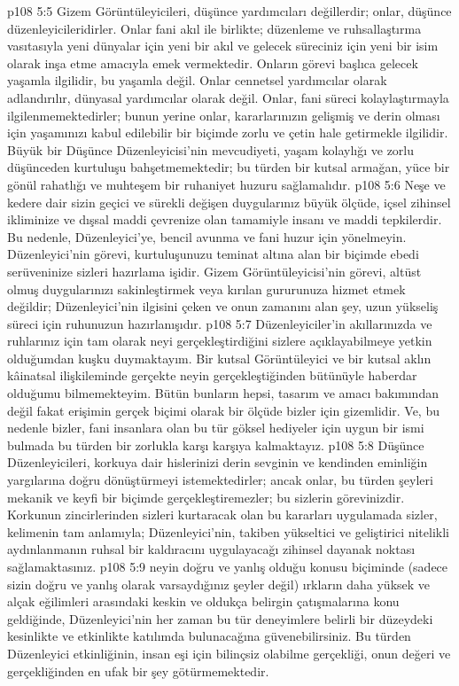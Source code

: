 \vs p108 5:5 Gizem Görüntüleyicileri, düşünce yardımcıları değillerdir; onlar, düşünce düzenleyicileridirler. Onlar fani akıl ile birlikte; düzenleme ve ruhsallaştırma vasıtasıyla yeni dünyalar için yeni bir akıl ve gelecek süreciniz için yeni bir isim olarak inşa etme amacıyla emek vermektedir. Onların görevi başlıca gelecek yaşamla ilgilidir, bu yaşamla değil. Onlar cennetsel yardımcılar olarak adlandırılır, dünyasal yardımcılar olarak değil. Onlar, fani süreci kolaylaştırmayla ilgilenmemektedirler; bunun yerine onlar, kararlarınızın gelişmiş ve derin olması için yaşamınızı kabul edilebilir bir biçimde zorlu ve çetin hale getirmekle ilgilidir. Büyük bir Düşünce Düzenleyicisi’nin mevcudiyeti, yaşam kolaylığı ve zorlu düşünceden kurtuluşu bahşetmemektedir; bu türden bir kutsal armağan, yüce bir gönül rahatlığı ve muhteşem bir ruhaniyet huzuru sağlamalıdır.
\vs p108 5:6 Neşe ve kedere dair sizin geçici ve sürekli değişen duygularınız büyük ölçüde, içsel zihinsel ikliminize ve dışsal maddi çevrenize olan tamamiyle insanı ve maddi tepkilerdir. Bu nedenle, Düzenleyici’ye, bencil avunma ve fani huzur için yönelmeyin. Düzenleyici’nin görevi, kurtuluşunuzu teminat altına alan bir biçimde ebedi serüveninize sizleri hazırlama işidir. Gizem Görüntüleyicisi’nin görevi, altüst olmuş duygularınızı sakinleştirmek veya kırılan gururunuza hizmet etmek değildir; Düzenleyici’nin ilgisini çeken ve onun zamanını alan şey, uzun yükseliş süreci için ruhunuzun hazırlanışıdır.
\vs p108 5:7 Düzenleyiciler’in akıllarınızda ve ruhlarınız için tam olarak neyi gerçekleştirdiğini sizlere açıklayabilmeye yetkin olduğumdan kuşku duymaktayım. Bir kutsal Görüntüleyici ve bir kutsal aklın kâinatsal ilişkileminde gerçekte neyin gerçekleştiğinden bütünüyle haberdar olduğumu bilmemekteyim. Bütün bunların hepsi, tasarım ve amacı bakımından değil fakat erişimin gerçek biçimi olarak bir ölçüde bizler için gizemlidir. Ve, bu nedenle bizler, fani insanlara olan bu tür göksel hediyeler için uygun bir ismi bulmada bu türden bir zorlukla karşı karşıya kalmaktayız.
\vs p108 5:8 Düşünce Düzenleyicileri, korkuya dair hislerinizi derin sevginin ve kendinden eminliğin yargılarına doğru dönüştürmeyi istemektedirler; ancak onlar, bu türden şeyleri mekanik ve keyfi bir biçimde gerçekleştiremezler; bu sizlerin görevinizdir. Korkunun zincirlerinden sizleri kurtaracak olan bu kararları uygulamada sizler, kelimenin tam anlamıyla; Düzenleyici’nin, takiben yükseltici ve geliştirici nitelikli aydınlanmanın ruhsal bir kaldıracını uygulayacağı zihinsel dayanak noktası sağlamaktasınız.
\vs p108 5:9  neyin doğru ve yanlış olduğu konusu biçiminde (sadece sizin doğru ve yanlış olarak varsaydığınız şeyler değil) ırkların daha yüksek ve alçak eğilimleri arasındaki keskin ve oldukça belirgin çatışmalarına konu geldiğinde, Düzenleyici’nin her zaman bu tür deneyimlere belirli bir düzeydeki kesinlikte ve etkinlikte katılımda bulunacağına güvenebilirsiniz. Bu türden Düzenleyici etkinliğinin, insan eşi için bilinçsiz olabilme gerçekliği, onun değeri ve gerçekliğinden en ufak bir şey götürmemektedir.
